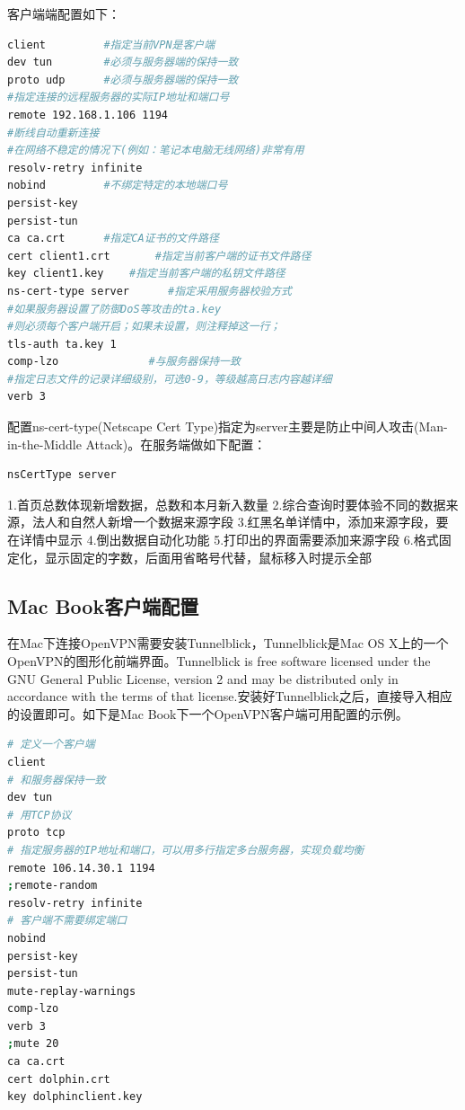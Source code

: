 \documentclass[letter]{book}
\begin{document}
客户端端配置如下：

\begin{lstlisting}[language=Bash]
client         #指定当前VPN是客户端
dev tun        #必须与服务器端的保持一致
proto udp      #必须与服务器端的保持一致
#指定连接的远程服务器的实际IP地址和端口号
remote 192.168.1.106 1194      
#断线自动重新连接
#在网络不稳定的情况下(例如：笔记本电脑无线网络)非常有用
resolv-retry infinite
nobind         #不绑定特定的本地端口号
persist-key
persist-tun
ca ca.crt      #指定CA证书的文件路径
cert client1.crt       #指定当前客户端的证书文件路径
key client1.key    #指定当前客户端的私钥文件路径
ns-cert-type server      #指定采用服务器校验方式
#如果服务器设置了防御DoS等攻击的ta.key
#则必须每个客户端开启；如果未设置，则注释掉这一行；
tls-auth ta.key 1     
comp-lzo              #与服务器保持一致
#指定日志文件的记录详细级别，可选0-9，等级越高日志内容越详细
verb 3                
\end{lstlisting}

配置ns-cert-type(Netscape Cert Type)指定为server主要是防止中间人攻击(Man-in-the-Middle Attack)。在服务端做如下配置：

\begin{lstlisting}[language=Bash]
nsCertType server
\end{lstlisting}

1.首页总数体现新增数据，总数和本月新入数量
2.综合查询时要体验不同的数据来源，法人和自然人新增一个数据来源字段
3.红黑名单详情中，添加来源字段，要在详情中显示
4.倒出数据自动化功能
5.打印出的界面需要添加来源字段
6.格式固定化，显示固定的字数，后面用省略号代替，鼠标移入时提示全部

\subsection{Mac Book客户端配置}

在Mac下连接OpenVPN需要安装Tunnelblick，Tunnelblick是Mac OS X上的一个OpenVPN的图形化前端界面。Tunnelblick is free software licensed under the GNU General Public License, version 2 and may be distributed only in accordance with the terms of that license.安装好Tunnelblick之后，直接导入相应的设置即可。如下是Mac Book下一个OpenVPN客户端可用配置的示例。

\begin{lstlisting}[language=Bash]
# 定义一个客户端
client
# 和服务器保持一致
dev tun
# 用TCP协议
proto tcp
# 指定服务器的IP地址和端口，可以用多行指定多台服务器，实现负载均衡
remote 106.14.30.1 1194
;remote-random
resolv-retry infinite
# 客户端不需要绑定端口
nobind
persist-key
persist-tun
mute-replay-warnings
comp-lzo
verb 3
;mute 20
ca ca.crt
cert dolphin.crt
key dolphinclient.key
\end{lstlisting}
\end{document}
